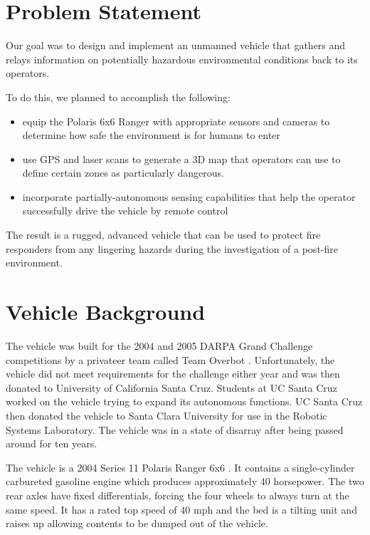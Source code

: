 \section{Problem Statement}

Our goal was to design and implement an unmanned vehicle
that gathers and relays information on potentially 
hazardous environmental conditions back to its operators.

To do this, we planned to accomplish the following:
\begin{itemize}
\item equip the Polaris 6x6 Ranger with appropriate sensors and cameras to determine how safe the environment is for humans to enter
\item use GPS and laser scans to generate a 3D map that operators can use to define certain zones as particularly dangerous.
\item incorporate partially-autonomous sensing capabilities that help the operator successfully drive the vehicle by remote control
 \end{itemize} 
 The result is a rugged, advanced vehicle that can be used to protect fire responders from any lingering hazards during the investigation of a post-fire environment. 



\section{Vehicle Background}
The vehicle was built for the 2004 and 2005 DARPA Grand Challenge competitions by a privateer team called Team Overbot \cite{rslrover2014}.  Unfortunately, the vehicle did not meet requirements for the challenge either year and was then donated to University of California Santa Cruz.  Students at UC Santa Cruz worked on the vehicle trying to expand its autonomous functions.   UC Santa Cruz then donated the vehicle to Santa Clara University for use in the Robotic Systems Laboratory.  The vehicle was in a state of disarray after being passed around for ten years.  

The vehicle is a 2004 Series 11 Polaris Ranger 6x6 \cite{rslrover2014}.  It contains a single-cylinder carbureted gasoline engine which produces approximately 40 horsepower.  The two rear axles have fixed differentials, forcing the four wheels to always turn at the same speed.  It has a rated top speed of 40 mph and the bed is a tilting unit and raises up allowing contents to be dumped out of the vehicle.  

